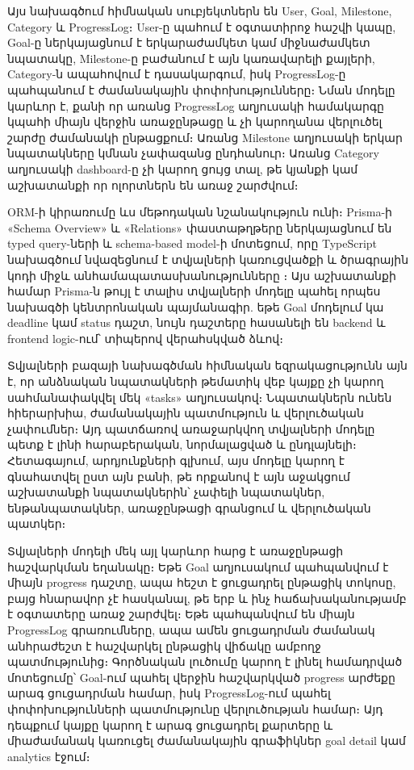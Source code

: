 Այս նախագծում հիմնական սուբյեկտներն են User, Goal, Milestone, Category և ProgressLog։ User-ը պահում է օգտատիրոջ հաշվի կապը, Goal-ը ներկայացնում է երկարաժամկետ կամ միջնաժամկետ նպատակը, Milestone-ը բաժանում է այն կառավարելի քայլերի, Category-ն ապահովում է դասակարգում, իսկ ProgressLog-ը պահպանում է ժամանակային փոփոխությունները։ Նման մոդելը կարևոր է, քանի որ առանց ProgressLog աղյուսակի համակարգը կպահի միայն վերջին առաջընթացը և չի կարողանա վերլուծել շարժը ժամանակի ընթացքում։ Առանց Milestone աղյուսակի երկար նպատակները կմնան չափազանց ընդհանուր։ Առանց Category աղյուսակի dashboard-ը չի կարող ցույց տալ, թե կյանքի կամ աշխատանքի որ ոլորտներն են առաջ շարժվում։

ORM-ի կիրառումը ևս մեթոդական նշանակություն ունի։ Prisma-ի «Schema Overview» և «Relations» փաստաթղթերը ներկայացնում են typed query-ների և schema-based model-ի մոտեցում, որը TypeScript նախագծում նվազեցնում է տվյալների կառուցվածքի և ծրագրային կոդի միջև անհամապատասխանությունները \autocite{prismaDocsSchema,prismaDocsRelations}։ Այս աշխատանքի համար Prisma-ն թույլ է տալիս տվյալների մոդելը պահել որպես նախագծի կենտրոնական պայմանագիր. եթե Goal մոդելում կա deadline կամ status դաշտ, նույն դաշտերը հասանելի են backend և frontend logic-ում՝ տիպերով վերահսկված ձևով։

Տվյալների բազայի նախագծման հիմնական եզրակացությունն այն է, որ անձնական նպատակների թեմատիկ վեբ կայքը չի կարող սահմանափակվել մեկ «tasks» աղյուսակով։ Նպատակներն ունեն հիերարխիա, ժամանակային պատմություն և վերլուծական չափումներ։ Այդ պատճառով առաջարկվող տվյալների մոդելը պետք է լինի հարաբերական, նորմալացված և ընդլայնելի։ Հետագայում, արդյունքների գլխում, այս մոդելը կարող է գնահատվել ըստ այն բանի, թե որքանով է այն աջակցում աշխատանքի նպատակներին՝ չափելի նպատակներ, ենթանպատակներ, առաջընթացի գրանցում և վերլուծական պատկեր։

Տվյալների մոդելի մեկ այլ կարևոր հարց է առաջընթացի հաշվարկման եղանակը։ Եթե Goal աղյուսակում պահպանվում է միայն progress դաշտը, ապա հեշտ է ցուցադրել ընթացիկ տոկոսը, բայց հնարավոր չէ հասկանալ, թե երբ և ինչ հաճախականությամբ է օգտատերը առաջ շարժվել։ Եթե պահպանվում են միայն ProgressLog գրառումները, ապա ամեն ցուցադրման ժամանակ անհրաժեշտ է հաշվարկել ընթացիկ վիճակը ամբողջ պատմությունից։ Գործնական լուծումը կարող է լինել համադրված մոտեցումը՝ Goal-ում պահել վերջին հաշվարկված progress արժեքը արագ ցուցադրման համար, իսկ ProgressLog-ում պահել փոփոխությունների պատմությունը վերլուծության համար։ Այդ դեպքում կայքը կարող է արագ ցուցադրել քարտերը և միաժամանակ կառուցել ժամանակային գրաֆիկներ goal detail կամ analytics էջում։

